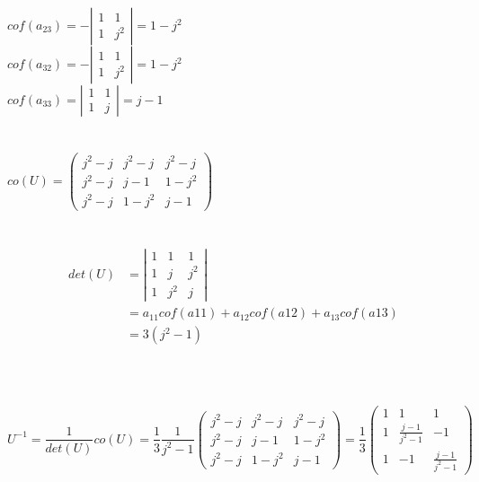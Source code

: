 \documentclass[11pt, fleqn]{report}
\begin{document}
$ cof(a_{23}) = -\left|\begin{array}{cc}1 & 1\\1 & j^2\end{array}\right| = 1-j^2 $ \\
$ cof(a_{32}) = -\left|\begin{array}{cc}1 & 1\\1 & j^2\end{array}\right| = 1-j^2 $ \\
$ cof(a_{33}) = \left|\begin{array}{cc}1 & 1 \\1 & j\end{array}\right| = j-1 $ \\
\\
\\
$ co(U) = \left(\begin{array}{ccc}j^2-j & j^2-j & j^2-j \\j^2-j & j-1 & 1-j^2 \\j^2-j & 1-j^2 & j-1\end{array}\right) $
\\
\\
\\

\begin{align*}
det(U) 
&= \left|\begin{array}{ccc}1 & 1 & 1 \\1 & j & j^2 \\1 & j^2 & j\end{array}\right| \\
&=  a_{11}cof(a11)+a_{12}cof(a12)+a_{13}cof(a13) \\
&= 3(j^2-1) \\
\end{align*}
\\
\\
\\

$U^{-1} = \dfrac {1} {det(U)} co(U) = \dfrac {1}{3} \dfrac {1}{j^2-1} \left(\begin{array}{ccc}j^2-j & j^2-j & j^2-j \\j^2-j & j-1 & 1-j^2 \\j^2-j & 1-j^2 & j-1\end{array}\right)= \dfrac {1}{3}\left(\begin{array}{ccc}1 & 1 & 1 \\1 & \frac{j-1}{j^2-1} & -1 \\1 & -1 & \frac{j-1}{j^2-1}\end{array}\right) $
\\
\\
\\
\end{document}
